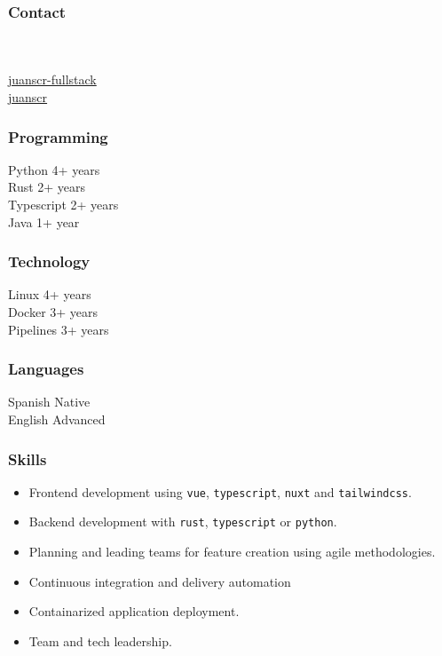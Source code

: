 \documentclass[11pt,a4paper]{article}
\begin{document}
{
%
\sloppy
%
\subsubsection*{Contact}
%
{\Large\faPhone} \myphone \vspace{0.3cm} \\
%
{\Large\faAt} \myemail \vspace{0.3cm} \\
%
{\Large\faLinkedin}
\href{https://www.linkedin.com/in/juanscr-fullstack}{juanscr-fullstack}
\vspace{0.3cm} \\
%
{\large\faGithub}  \href{https://github.com/juanscr}{juanscr}
%
\subsubsection*{Programming}
%
{\Large\faPython} Python \hfill 4+ years \vspace{0.3cm} \\
%
{\Large\faRust} Rust \hfill 2+ years \vspace{0.3cm} \\
%
{\Large\faJs} Typescript \hfill 2+ years \vspace{0.3cm} \\
%
{\Large\faJava} Java \hfill 1+ year
%
\subsubsection*{Technology}
%
{\Large\faLinux} Linux \hfill 4+ years \vspace{0.3cm} \\
%
{\Large\faDocker} Docker \hfill 3+ years \vspace{0.3cm} \\
%
{\Large\faBitbucket} Pipelines \hfill 3+ years
%
\subsubsection*{Languages}
%
Spanish \hfill Native \vspace{0.3cm} \\
%
English \hfill Advanced
%
\subsubsection*{Skills}
%
\begin{itemize}[leftmargin=*]
%
    \item Frontend development using \texttt{vue}, \texttt{typescript},
        \texttt{nuxt} and \texttt{tailwindcss}.
%
    \item Backend development with \texttt{rust}, \texttt{typescript} or
        \texttt{python}.
%
    \item Planning and leading teams for feature creation using agile
        methodologies.
%
    \item Continuous integration and delivery automation
%
    \item Containarized application deployment.
%
    \item Team and tech leadership.
%
\end{itemize}
%
}
\end{document}
